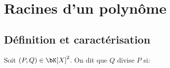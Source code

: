 \documentclass[a4paper, 11pt,reqno]{article}
\begin{document}
%
%
%
%
%
%
%
%


%

\section{Racines d'un polyn\^ome}

\subsection{D\'efinition et caract\'erisation}

{\noindent

	\begin{defi}
		Soit $(P,Q)\in\bK[X]^2$. On dit que $Q$ divise $P$ si:\\


	\end{defi}
}\vsec\vsec
\end{document}
